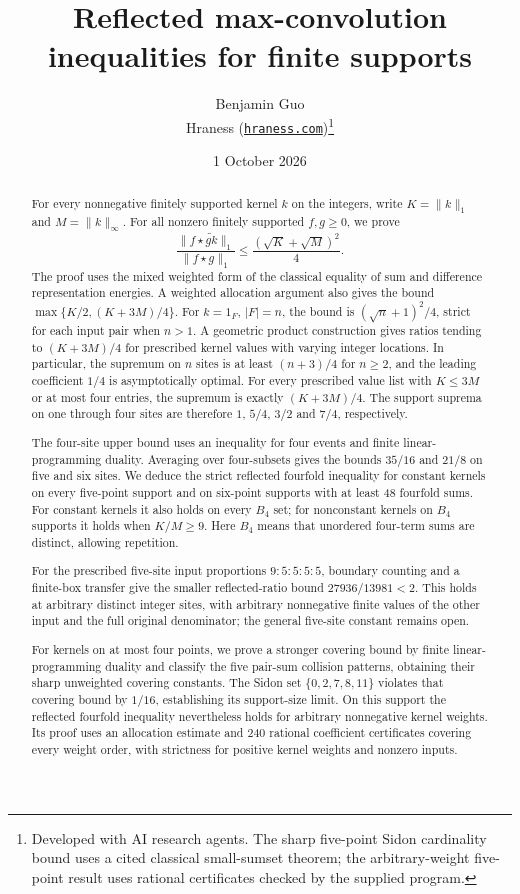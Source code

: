 \documentclass[11pt]{article}
\title{Reflected max-convolution inequalities for finite supports}
\author{Benjamin Guo\\Hraness (\href{https://hraness.com}{\texttt{hraness.com}})\thanks{Developed with AI research agents. The sharp five-point Sidon cardinality bound uses a cited classical small-sumset theorem; the arbitrary-weight five-point result uses rational certificates checked by the supplied program.}}
\date{1 October 2026}
\theoremstyle{remark}
\numberwithin{equation}{section}
\begin{document}
\maketitle
\begin{abstract}
For every nonnegative finitely supported kernel $k$ on the integers,
write $K=\|k\|_1$ and $M=\|k\|_\infty$. For all nonzero finitely
supported $f,g\ge0$, we prove
\[
 \frac{\|f\star\widetilde{gk}\|_1}{\|f\star g\|_1}
 \le\frac{(\sqrt K+\sqrt M)^2}{4}.
\]
The proof uses the mixed weighted form of the classical equality of
sum and difference representation energies. A weighted allocation argument
also gives the bound $\max\{K/2,(K+3M)/4\}$. For $k=1_F$, $|F|=n$,
the bound is $(\sqrt n+1)^2/4$, strict for each input pair when $n>1$.
A geometric product construction gives ratios tending to $(K+3M)/4$
for prescribed kernel values with varying integer locations. In particular,
the supremum on $n$ sites is at least $(n+3)/4$ for $n\ge2$, and the
leading coefficient $1/4$ is asymptotically optimal. For every prescribed
value list with $K\le3M$ or at most four entries, the supremum is exactly
$(K+3M)/4$. The support suprema on one through four sites are therefore
$1$, $5/4$, $3/2$ and $7/4$, respectively.

The four-site upper bound uses an inequality for four events and finite
linear-programming duality. Averaging over four-subsets gives the bounds
$35/16$ and $21/8$ on five and six sites. We deduce the strict reflected
fourfold inequality for constant kernels on every five-point support and
on six-point supports with at least 48 fourfold sums. For constant kernels
it also holds on every $B_4$ set; for nonconstant kernels on $B_4$
supports it holds when $K/M\ge9$. Here $B_4$ means that unordered
four-term sums are distinct, allowing repetition.

For the prescribed five-site input proportions $9:5:5:5:5$, boundary
counting and a finite-box transfer give the smaller reflected-ratio
bound $27936/13981<2$. This holds at arbitrary distinct integer sites,
with arbitrary nonnegative finite values of the other input and the
full original denominator; the general five-site constant remains open.

For kernels on at most four points, we prove a stronger covering bound
by finite linear-programming duality and classify the five pair-sum
collision patterns, obtaining their sharp unweighted covering constants.
The Sidon set $\{0,2,7,8,11\}$ violates that covering bound by $1/16$,
establishing its support-size limit. On this support the reflected
fourfold inequality nevertheless holds for arbitrary nonnegative kernel
weights. Its proof uses an allocation estimate and 240 rational coefficient
certificates covering every weight order, with strictness for positive
kernel weights and nonzero inputs.
\end{abstract}
\end{document}
